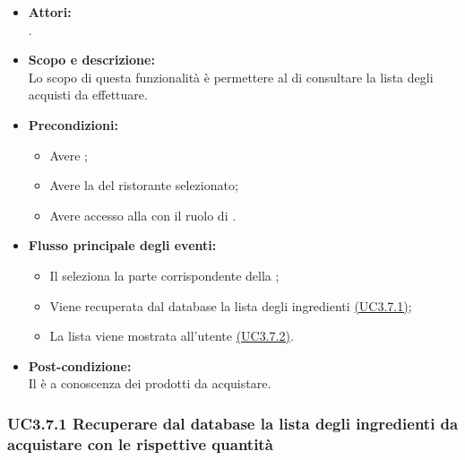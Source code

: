 \begin{itemize}
	\item \textbf{Attori:}
	\\.
	\item \textbf{Scopo e descrizione:} 
	\\Lo scopo di questa funzionalità è permettere al  di consultare la lista degli acquisti da effettuare.
	\item \textbf{Precondizioni:}
	\begin{itemize}
		\item Avere ;
		\item Avere la  del ristorante selezionato;
		\item Avere accesso alla  con il ruolo di .
	\end{itemize}
	\item \textbf{Flusso principale degli eventi:}
	\begin{itemize}
		\item Il  seleziona la parte corrispondente della ;
		\item Viene recuperata dal database la lista degli ingredienti \hyperref[UC3.7.1]{(UC3.7.1)};
		\item La lista viene mostrata all'utente \hyperref[UC3.7.2]{(UC3.7.2)}.
	\end{itemize}
	\item \textbf{Post-condizione:}
	\\Il {} è a conoscenza dei prodotti da acquistare.
\end{itemize}

\subsubsection{UC3.7.1 Recuperare dal database la lista degli ingredienti da acquistare con le rispettive quantità} \label{UC3.7.1}

